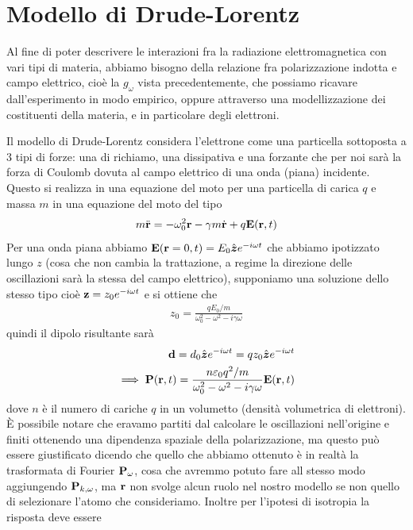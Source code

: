 \section{Modello di Drude-Lorentz} \label{section:_Drude-Lorentz}
Al fine di poter descrivere le interazioni fra la radiazione elettromagnetica con vari tipi di materia, abbiamo bisogno della relazione fra polarizzazione 
indotta e campo elettrico, cioè la $ g_\omega $ vista precedentemente, che possiamo ricavare dall'esperimento in modo empirico, oppure attraverso una 
modellizzazione dei costituenti della materia, e in particolare degli elettroni.

Il modello di Drude-Lorentz considera l'elettrone come una particella sottoposta a 3 tipi di forze: una di richiamo, una dissipativa e una forzante che per 
noi sarà la forza di Coulomb dovuta al campo elettrico di una onda (piana) incidente. 
Questo si realizza in una equazione del moto per una particella di carica $ q $ e massa $ m $ in una equazione del moto del tipo 
\begin{align}
  m \ddot{\mathbf{r}} = - \omega_0^2 \mathbf{r} - \gamma m \dot{\mathbf{r}} + q \mathbf{E}(\mathbf{r}, t)
\end{align}
Per una onda piana abbiamo $ \mathbf{E}(\mathbf{r} = 0 , t) = E_0 \hat{\boldsymbol{z}} e^{-i\omega t} $ che abbiamo ipotizzato lungo $ z $ (cosa che non cambia la trattazione, 
a regime la direzione delle oscillazioni sarà la stessa del campo elettrico), supponiamo una soluzione dello stesso tipo cioè $ \mathbf{z} = z_0 e^{-i\omega t} $ 
e si ottiene che 
\begin{align}
  z_0 = \frac{ qE_0 / m}{\omega_0^2 - \omega^2 - i \gamma \omega} 
\end{align}
quindi il dipolo risultante sarà
\begin{align}
  \mathbf{d} = d_0 \hat{\boldsymbol{z}} e^{-i\omega t} = q z_0 \hat{\boldsymbol{z}} e^{-i \omega t}
  \\
  \implies \mathbf{P}(\mathbf{r} , t) = \frac{n \varepsilon_0 q^2 /m}{\omega_0^2 - \omega^2 - i \gamma \omega} \mathbf{E}(\mathbf{r} , t)
\end{align}
dove $ n $ è il numero di cariche $ q $ in un volumetto (densità volumetrica di elettroni). È possibile notare che eravamo partiti dal calcolare le 
oscillazioni nell'origine e finiti ottenendo una dipendenza spaziale della polarizzazione, ma questo può essere giustificato dicendo che quello che abbiamo 
ottenuto è in realtà la trasformata di Fourier $ \mathbf{P}_\omega $, cosa che avremmo potuto fare all stesso modo aggiungendo $ \mathbf{P}_{k,\omega} $, ma $ \mathbf{r} $ 
non svolge alcun ruolo nel nostro modello se non quello di selezionare l'atomo che consideriamo. Inoltre per l'ipotesi di isotropia la risposta deve essere 
